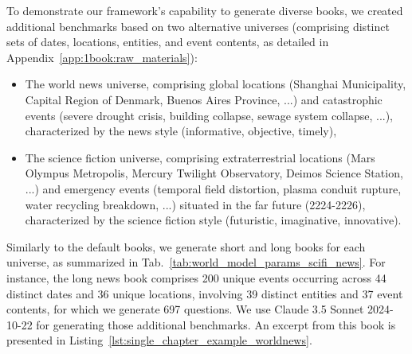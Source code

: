 \documentclass{article}
\begin{document}
To demonstrate our framework's capability to generate diverse books, we created additional benchmarks based on two alternative universes (comprising distinct sets of dates, locations, entities, and event contents, as detailed in Appendix~\ref{app:1book:raw_materials}):
\begin{itemize}
\item The world news universe, comprising global locations (Shanghai Municipality, Capital Region of Denmark, Buenos Aires Province, ...) and catastrophic events (severe drought crisis, building collapse, sewage system collapse, ...), characterized by the news style (informative, objective, timely),
\item The science fiction universe, comprising extraterrestrial locations (Mars Olympus Metropolis, Mercury Twilight Observatory, Deimos Science Station, ...) and emergency events (temporal field distortion, plasma conduit rupture, water recycling breakdown, ...) situated in the far future (2224-2226), characterized by the science fiction style (futuristic, imaginative, innovative).
\end{itemize}

Similarly to the default books, we generate short and long books for each universe, as summarized in Tab.~\ref{tab:world_model_params_scifi_news}. For instance, the long news book comprises 200 unique events occurring across 44 distinct dates and 36 unique locations, involving 39 distinct entities and 37 event contents, for which we generate 697 questions. We use Claude 3.5 Sonnet 2024-10-22 for generating those additional benchmarks. An excerpt from this book is presented in Listing~\ref{lst:single_chapter_example_worldnews}.
\end{document}
